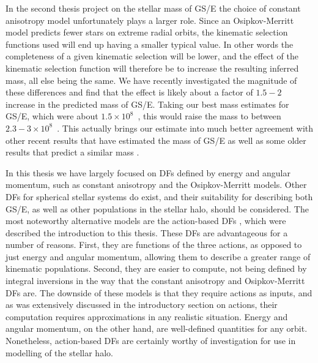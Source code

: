 In the second thesis project on the stellar mass of GS/E the choice of constant anisotropy model unfortunately plays a larger role. Since an Osipkov-Merritt model predicts fewer stars on extreme radial orbits, the kinematic selection functions used will end up having a smaller typical value. In other words the completeness of a given kinematic selection will be lower, and the effect of the kinematic selection function will therefore be to increase the resulting inferred mass, all else being the same. We have recently investigated the magnitude of these differences and find that the effect is likely about a factor of $1.5-2$ increase in the predicted mass of GS/E. Taking our best mass estimates for GS/E, which were about $1.5\times10^{8}$~\Msun, this would raise the mass to between $2.3-3\times10^{8}$~\Msun. This actually brings our estimate into much better agreement with other recent results that have estimated the mass of GS/E \parencite[e.g.][]{callingham22,han22,carrillo23} as well as some older results that predict a similar mass \parencite[e.g.][]{kruijssen19b,mackereth20}.

In this thesis we have largely focused on DFs defined by energy and angular momentum, such as constant anisotropy and the Osipkov-Merritt models. Other DFs for spherical stellar systems do exist, and their suitability for describing both GS/E, as well as other populations in the stellar halo, should be considered. The most noteworthy alternative models are the action-based DFs \parencite{binney14d,posti15}, which were described the introduction to this thesis. These DFs are advantageous for a number of reasons. First, they are functions of the three actions, as opposed to just energy and angular momentum, allowing them to describe a greater range of kinematic populations. Second, they are easier to compute, not being defined by integral inversions in the way that the constant anisotropy and Osipkov-Merritt DFs are. The downside of these models is that they require actions as inputs, and as was extensively discussed in the introductory section on actions, their computation requires approximations in any realistic situation. Energy and angular momentum, on the other hand, are well-defined quantities for any orbit. Nonetheless, action-based DFs are certainly worthy of investigation for use in modelling of the stellar halo.

